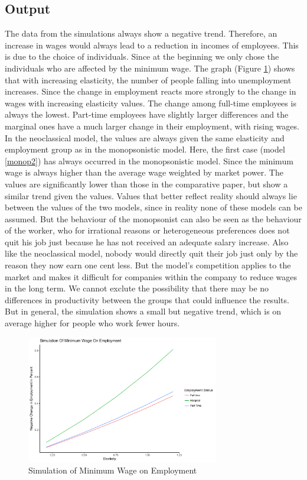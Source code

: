 \documentclass[a4paper]{article}
\begin{document}
\subsection{Output}
The data from the simulations always show a negative trend. Therefore, an increase in wages would always lead to a reduction in incomes of employees. This is due to the choice of individuals. Since at the beginning we only chose the individuals who are affected by the minimum wage. The graph (Figure \ref{simu}) shows that with increasing elasticity, the number of people falling into unemployment increases. Since the change in employment reacts more strongly to the change in wages with increasing elasticity values. The change among full-time employees is always the lowest. Part-time employees have slightly larger differences and the marginal ones have a much larger change in their employment, with rising wages. In the neoclassical model, the values are always given the same elasticity and employment group as in the monopsonistic model. Here, the first case (model \ref{monop2}) has always occurred in the monopsonistic model. Since the minimum wage is always higher than the average wage weighted by market power. The values are significantly lower than those in the comparative paper, but show a similar trend given the values. Values that better reflect reality should always lie between the values of the two models, since in reality none of these models can be assumed. But the behaviour of the monopsonist can also be seen as the behaviour of the worker, who for irrational reasons or heterogeneous preferences does not quit his job just because he has not received an adequate salary increase. Also like the neoclassical model, nobody would directly quit their job just only by the reason they now earn one cent less. But the model's competition applies to the market and makes it difficult for companies within the company to reduce wages in the long term. We cannot exclute the possibility that there may be no differences in productivity between the groups that could influence the results. But in general, the simulation shows a small but negative trend, which is on average higher for people who work fewer hours. 
\begin{figure}[h]
\caption{Simulation of Minimum Wage on Employment}
\label{simu}
\centering
\includegraphics[width=0.75\textwidth]{q3/plot_graph_effect_minwage_output.png}
\end{figure}
\end{document}
